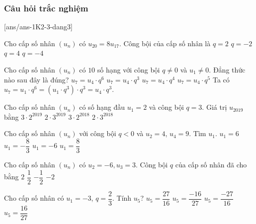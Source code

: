 \subsubsection{Câu hỏi trắc nghiệm}
[ans/ans-1K2-3-dang3]
\begin{ex}%
	Cho cấp số nhân $(u_n)$ có $u_{20}=8u_{17}$. Công bội của cấp số nhân là
	\choice
	{\True $q=2$}
	{$q=-2$}
	{$q=4$}
	{$q=-4$}
\end{ex}
\begin{ex}%
	Cho cấp số nhân $\left(u_n\right)$ có $10$ số hạng với công bội $q\neq 0$ và $u_1\neq 0$. Đẳng thức nào sau đây là đúng?
	\choice
	{$u_7=u_4\cdot q^6$}
	{\True $u_7=u_4\cdot q^3$}
	{$u_7=u_4\cdot q^4$}
	{$u_7=u_4\cdot q^5$}
	\loigiai
	{Ta có $u_7=u_1\cdot q^6=\left(u_1\cdot q^3\right)\cdot q^3=u_4\cdot q^3$.
	}
\end{ex}
\begin{ex}%
	Cho cấp số nhân $(u_n)$ có số hạng đầu $u_1=2$ và công bội $q=3$. Giá trị $u_{2019}$ bằng
	\choice
	{$3\cdot2^{2019}$}
	{$2\cdot3^{2019}$}
	{$3\cdot2^{2018}$}
	{\True $2\cdot3^{2018}$}
\end{ex}
\begin{ex}%
	Cho cấp số nhân $(u_n)$ với công bội $q < 0$ và $u_2=4$, $u_4=9$. Tìm $u_1$.
	\choice
	{$u_1=6$}
	{\True $u_1=-\dfrac{8}{3}$}
	{$u_1=-6$}
	{$u_1=\dfrac{8}{3}$}
\end{ex}
\begin{ex}%
	Cho cấp số nhân $\left(u_{n}\right)$ có $u_{2}=-6, u_{3}=3$. Công bội $q$ của cấp số nhân đã cho bằng
	\choice
	{$2 $}
	{$\dfrac{1}{2}$}
	{\True $-\dfrac{1}{2}$}
	{$-2$}
\end{ex}
\begin{ex}%
	Cho cấp số nhân có $u_1=-3$, $q=\dfrac{2}{3}$. Tính $u_5$?
	\choice
	{$u_5=\dfrac{27}{16}$}
	{\True $u_5=\dfrac{-16}{27}$}
	{$u_5=\dfrac{-27}{16}$}
	{$u_5=\dfrac{16}{27}$}
\end{ex}

